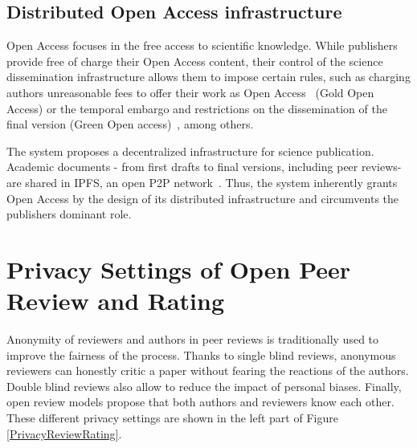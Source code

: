 
  \subsection{Distributed Open Access infrastructure}
  \label{distributedOA}
  Open Access focuses in the free access to scientific knowledge. While
  publishers provide free of charge their Open Access content, their control of
  the science dissemination infrastructure allows them to impose certain rules,
  such as charging authors unreasonable fees to offer their work as Open
  Access~\cite{solomon2012study} (Gold Open Access) or the temporal embargo and
  restrictions on the dissemination of the final version (Green Open
  access)~\cite{bjork2014anatomy}, among others.

  The system proposes a decentralized infrastructure for science publication.
  Academic documents - from first drafts to final versions, including peer
  reviews- are shared in IPFS, an open P2P
  network~\cite{benet_ipfs-content_2014}. Thus, the system inherently grants
  Open Access by the design of its distributed infrastructure and circumvents
  the publishers dominant role.

  \section{Privacy Settings of Open Peer Review and Rating}
  \label{privacy}
  Anonymity of reviewers and authors in peer reviews is traditionally used to
  improve the fairness of the process. Thanks to single blind reviews, anonymous
  reviewers can honestly critic a paper without fearing the reactions of the
  authors. Double blind reviews also allow to reduce the impact of personal
  biases. Finally, open review models propose that both authors and reviewers
  know each other. These different privacy settings are shown in the left part
  of Figure \ref{PrivacyReviewRating}.

